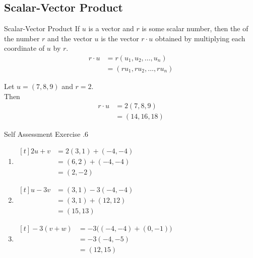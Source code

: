 \documentclass[../notes.tex]{subfiles}
\begin{document}
			\subsection{Scalar-Vector Product}
				\begin{definition}{Scalar-Vector Product}
					If $u$ is a vector and $r$ is some scalar number, then the  of the number $r$ and the vector $u$ is the vector $r \cdot u$ obtained by multiplying each coordinate of $u$ by $r$.
					\begin{align*}
						r\cdot u &= r(u_{1}, u_{2}, \ldots, u_{n})\\
						&= (ru_{1}, ru_{2}, \ldots, ru_{n})
					\end{align*}
				\end{definition}
				\begin{example}[width=0.5\textwidth]
					Let $u = (7, 8, 9)$ and $r = 2$.\\
					Then
					\begin{align*}
						r \cdot u &= 2(7, 8, 9)\\
						&= (14, 16, 18)
					\end{align*}
				\end{example}
				\begin{exercise}{Self Assessment Exercise \thechapter.6}
					\begin{enumerate}[label=(\alph*)]
						\item {} \hfill
							$ \begin{aligned}[t]
								2u + v &= 2(3, 1) + (-4, -4)\\
								&= (6, 2) + (-4, -4)\\
								&= (2, -2)
							\end{aligned} $ \hfill \phantom{}
						\item {} \hfill
							$ \begin{aligned}[t]
								u - 3v &= (3, 1) - 3(-4, -4)\\
								&= (3, 1) + (12, 12)\\
								&= (15, 13)
							\end{aligned} $ \hfill \phantom{}
						\item {} \hfill
							$ \begin{aligned}[t]
								-3(v + w) &= -3\bigl((-4, -4) + (0, -1)\bigr)\\
								&= -3(-4, -5)\\
								&= (12, 15)
							\end{aligned} $ \hfill \phantom{}
					\end{enumerate}
				\end{exercise}
			\pagebreak
\end{document}
